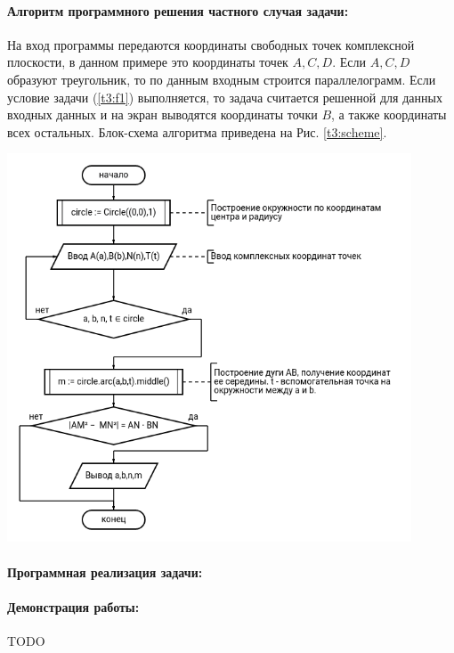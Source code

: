 {   \paragraph{Алгоритм программного решения частного случая задачи:}
   На вход программы передаются координаты свободных точек комплексной плоскости, в данном примере это координаты
   точек \(A,C,D\). Если \(A,C,D\) образуют треугольник, то по данным входным строится параллелограмм. Если
   условие задачи (\ref{t3:f1}) выполняется, то задача считается решенной для данных входных данных и на экран
   выводятся координаты точки \(B\), а также координаты всех остальных. Блок-схема алгоритма приведена
   на Рис. \ref{t3:scheme}.
   \begin{center}
      \includegraphics[width=0.9\textwidth]{images/task2-diagram.png}
      \label{t3:scheme}
   \end{center}
   \paragraph{Программная реализация задачи:}
   \paragraph{Демонстрация работы:}
   TODO %
}

